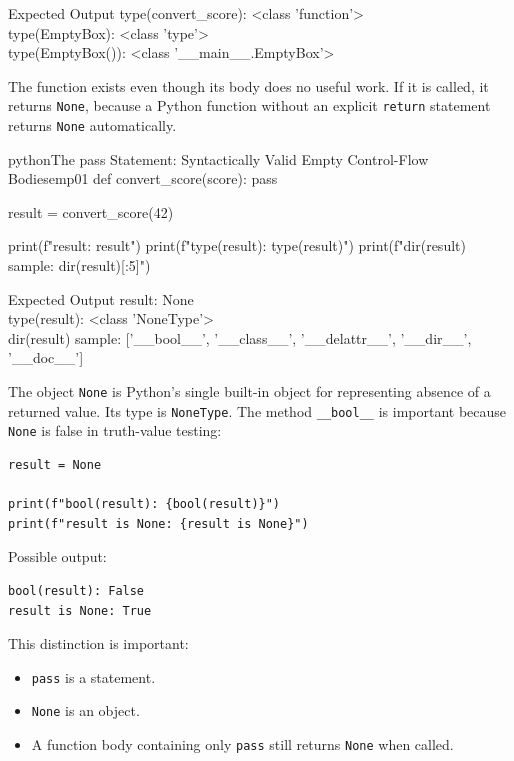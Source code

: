 \begin{iobox}{Expected Output}
type(convert\_score): <class 'function'> \\
type(EmptyBox): <class 'type'> \\
type(EmptyBox()): <class '\_\_main\_\_.EmptyBox'> \\
\end{iobox}




The function exists even though its body does no useful work. If it is called, it returns \texttt{None}, because a Python function without an explicit \texttt{return} statement returns \texttt{None} automatically.

\begin{codebox}[]{python}{The pass Statement: Syntactically Valid Empty Control-Flow Bodies}{emp01}
def convert_score(score):
    pass

result = convert_score(42)

print(f"result: {result}")
print(f"type(result): {type(result)}")
print(f"dir(result) sample: {dir(result)[:5]}")
\end{codebox}


\begin{iobox}{Expected Output}
result: None \\
type(result): <class 'NoneType'> \\
dir(result) sample: ['\_\_bool\_\_', '\_\_class\_\_', '\_\_delattr\_\_', '\_\_dir\_\_', '\_\_doc\_\_'] \\
\end{iobox}




The object \texttt{None} is Python's single built-in object for representing absence of a returned value. Its type is \texttt{NoneType}. The method \texttt{\_\_bool\_\_} is important because \texttt{None} is false in truth-value testing:

\begin{verbatim}
result = None

print(f"bool(result): {bool(result)}")
print(f"result is None: {result is None}")
\end{verbatim}

Possible output:

\begin{verbatim}
bool(result): False
result is None: True
\end{verbatim}

This distinction is important:

\begin{itemize}
    \item \texttt{pass} is a statement.
    \item \texttt{None} is an object.
    \item A function body containing only \texttt{pass} still returns \texttt{None} when called.
\end{itemize}

